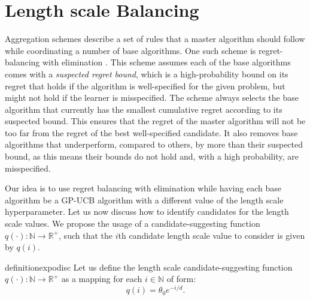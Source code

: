 \documentclass{article}
\theoremstyle{plain}
\theoremstyle{definition}
\theoremstyle{remark}
\theoremstyle{plain}
\begin{document}
\section{Length scale Balancing}
Aggregation schemes describe a set of rules that a master algorithm should follow while coordinating a number of base algorithms. One such scheme is regret-balancing with elimination \cite{pacchiano2020regret}. This scheme assumes each of the base algorithms comes with a \textit{suspected regret bound}, which is a high-probability bound on its regret that holds if the algorithm is well-specified for the given problem, but might not hold if the learner is misspecified. The scheme always selects the base algorithm that currently has the smallest cumulative regret according to its suspected bound. This ensures that the regret of the master algorithm will not be too far from the regret of the best well-specified candidate. It also removes base algorithms that underperform, compared to others, by more than their suspected bound, as this means their bounds do not hold and, with a high probability, are misspecified.


Our idea is to use regret balancing with elimination while having each base algorithm be a GP-UCB algorithm with a different value of the length scale hyperparameter.  Let us now discuss how to identify candidates for the length scale values. We propose the usage of a candidate-suggesting function $q(\cdot): \mathbb{N} \to \mathbb{R}^+$, such that the $i$th candidate length scale value to consider is given by $q(i)$.

\begin{restatable}[]{definition}{expodisc}
\label{def:expodisc} 
    Let us define the length scale candidate-suggesting function $q(\cdot): \mathbb{N} \to \mathbb{R}^+$ as a mapping for each $i \in \mathbb{N}$ of form: 
    \begin{equation*}
        q(i) = \theta_0  e^{-i / d} .
    \end{equation*}
\end{restatable}
\end{document}
